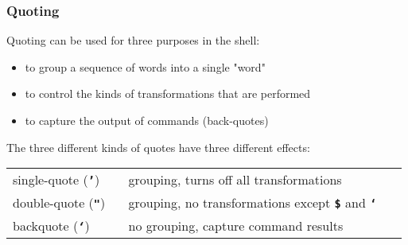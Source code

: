 \begin{frame}[shrink]
\frametitle{Quoting}
Quoting can be used for three purposes in the shell:
\begin{itemize}
\item  to group a sequence of words into a single "word"
\item  to control the kinds of transformations that are performed
\item  to capture the output of commands (back-quotes)
\end{itemize}
The three different kinds of quotes have three different effects:
\begin{center}

\begin{center}
\begin{tabular}{lll}

  \begin{minipage}{3cm}single-quote (\textbf{\tt{'}}) ~\end{minipage}
   & \begin{minipage}{17cm}grouping, turns off all transformations~\end{minipage}
\\[1ex]

  \begin{minipage}{3cm}double-quote (\textbf{\tt{"}}) ~\end{minipage}
   & \begin{minipage}{17cm}grouping, no transformations except \textbf{\tt{\$}} and \textbf{\tt{`}}~\end{minipage}
\\[1ex]

  \begin{minipage}{3cm}backquote ({\em{\textbf{\tt{`}}}}) ~\end{minipage}
   & \begin{minipage}{17cm}no grouping, capture command results~\end{minipage}
\\[1ex]
\end{tabular}
\end{center}

\end{center}
\end{frame}

